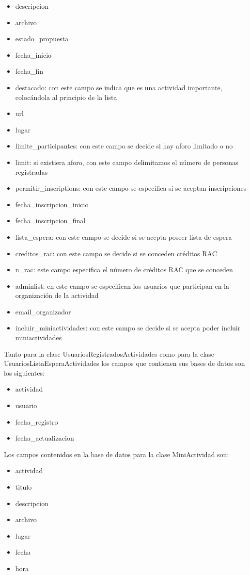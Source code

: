 \begin{itemize}
\begin{itemize}
		\item descripcion
		\item archivo
		\item estado\_propuesta 
		\item fecha\_inicio
		\item fecha\_fin
		\item destacado: con este campo se indica que es una actividad importante, colocándola al principio de la lista
		\item url
		\item  lugar
		\item limite\_participantes: con este campo se decide si hay aforo limitado o no
		\item limit: si existiera aforo, con este campo delimitamos el número de personas registradas
		\item permitir\_inscriptions: con este campo se especifica si se aceptan inscripciones
		\item fecha\_inscripcion\_inicio
		\item fecha\_inscripcion\_final
		\item lista\_espera: con este campo se decide si se acepta poseer lista de espera		
		\item creditos\_rac: con este campo se decide si se conceden créditos RAC
		\item n\_rac: este campo especifica el número de créditos RAC que se conceden
		\item adminlist: en este campo se especifican los usuarios que participan en la organización de la actividad
		\item email\_organizador
		\item incluir\_miniactividades: con este campo se decide si se acepta poder incluir miniactividades
	\end{itemize}	
Tanto para la clase UsuariosRegistradosActividades como para la clase UsuariosListaEsperaActividades los campos que contienen sus bases de datos son los siguientes:
	\begin{itemize}
		\item actividad
		\item usuario
		\item fecha\_registro
		\item fecha\_actualizacion
	\end{itemize}
Los campos contenidos en la base de datos para la clase MiniActividad son:
	\begin{itemize}
		\item actividad
		\item titulo
		\item descripcion
		\item archivo
		\item lugar
		\item fecha
		\item hora
	\end{itemize}


\end{itemize}
